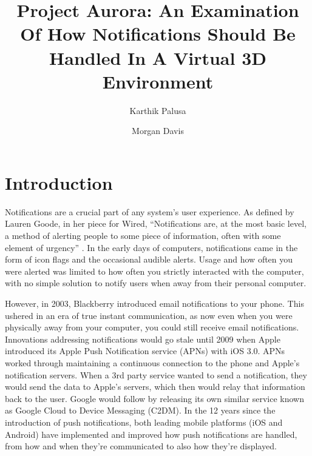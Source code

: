 \documentclass[acmlarge]{acmart}
\begin{document}
\title{Project Aurora: An Examination Of How Notifications Should Be Handled In A Virtual 3D Environment}


\author{Karthik Palusa}
\author{Morgan Davis}
\authornotemark[1]



\renewcommand{\shortauthors}{Karthik Palusa and Morgan Davis}





\maketitle

\section{Introduction}
Notifications are a crucial part of any system’s user experience. As defined by Lauren Goode, in her piece for Wired, “Notifications are, at the most basic level, a method of alerting people to some piece of information, often with some element of urgency” \citet{Goode19}. In the early days of computers, notifications came in the form of icon flags and the occasional audible alerts. Usage and how often you were alerted was limited to how often you strictly interacted with the computer, with no simple solution to notify users when away from their personal computer.
 
 However, in 2003, Blackberry introduced email notifications to your phone. This ushered in an era of true instant communication, as now even when you were physically away from your computer, you could still receive email notifications. Innovations addressing notifications would go stale until 2009 when Apple introduced its Apple Push Notification service (APNs) with iOS 3.0. APNs worked through maintaining a continuous connection to the phone and Apple’s notification servers. When a 3rd party service wanted to send a notification, they would send the data to Apple’s servers, which then would relay that information back to the user. Google would follow by releasing its own similar service known as Google Cloud to Device Messaging (C2DM). In the 12 years since the introduction of push notifications, both leading mobile platforms (iOS and Android) have implemented and improved how push notifications are handled, from how and when they’re communicated to also how they’re displayed. 
\end{document}
